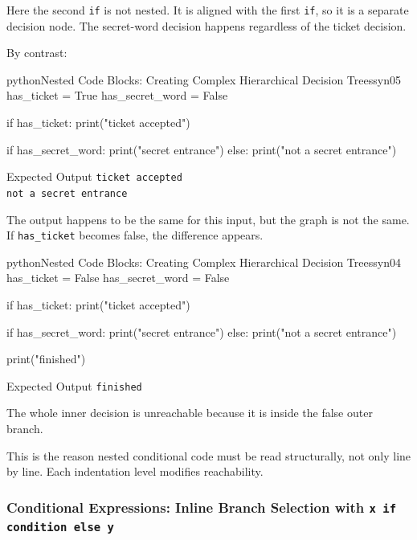 \documentclass[a4paper,twoside]{report}
\begin{document}
Here the second \texttt{if} is not nested. It is aligned with the first \texttt{if}, so it is a separate decision node. The secret-word decision happens regardless of the ticket decision.

By contrast:

\begin{codebox}[]{python}{Nested Code Blocks: Creating Complex Hierarchical Decision Trees}{syn05}
has_ticket = True
has_secret_word = False

if has_ticket:
    print("ticket accepted")

    if has_secret_word:
        print("secret entrance")
    else:
        print("not a secret entrance")
\end{codebox}


\begin{iobox}{Expected Output}
\texttt{ticket accepted} \\
\texttt{not a secret entrance} \\
\end{iobox}


The output happens to be the same for this input, but the graph is not the same. If \texttt{has\_ticket} becomes false, the difference appears.

\begin{codebox}[]{python}{Nested Code Blocks: Creating Complex Hierarchical Decision Trees}{syn04}
has_ticket = False
has_secret_word = False

if has_ticket:
    print("ticket accepted")

    if has_secret_word:
        print("secret entrance")
    else:
        print("not a secret entrance")

print("finished")
\end{codebox}


\begin{iobox}{Expected Output}
\texttt{finished} \\
\end{iobox}


The whole inner decision is unreachable because it is inside the false outer branch.

This is the reason nested conditional code must be read structurally, not only line by line. Each indentation level modifies reachability.

\subsubsection{Conditional Expressions: Inline Branch Selection with \texttt{x if condition else y}}
\end{document}
